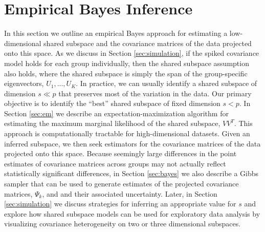\documentclass{statsoc}
\begin{document}


\section{Empirical Bayes Inference}
\label{sec:inference}

In this section we outline an empirical Bayes approach for estimating
a low-dimensional shared subspace and the covariance matrices of the
data projected onto this space. As we discuss in Section
\ref{sec:simulation}, if the spiked covariance model holds for each
group individually, then the shared subspace assumption also holds,
where the shared subspace is simply the span of the group-specific
eigenvectors, $U_1, ..., U_K$. In practice, we can usually identify a
shared subspace of dimension $s \ll p$ that preserves most of the
variation in the data.  Our primary objective is to identify the
``best'' shared subspace of fixed dimension $s < p$.  In Section
\ref{sec:em} we describe an expectation-maximization algorithm for
estimating the maximum marginal likelihood of the shared subspace,
$VV^T$.  This approach is computationally tractable for
high-dimensional datasets.  Given an inferred subspace, we then seek
estimators for the covariance matrices of the data projected onto this
space.  Because seemingly large differences in the point estimates of
covariance matrices across groups may not actually reflect
statistically significant differences, in Section \ref{sec:bayes} we
also describe a Gibbs sampler that can be used to generate estimates
of the projected covariance matrices, $\Psi_k$, and and their
associated uncertainty.  Later, in Section \ref{sec:simulation} we
discuss strategies for inferring an appropriate value for $s$ and
explore how shared subspace models can be used for exploratory data
analysis by visualizing covariance heterogeneity on two or three
dimensional subspaces.

\end{document}
